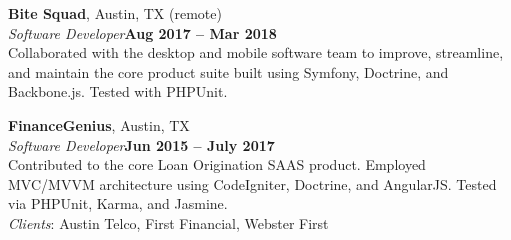 \documentclass[margin,line]{resume}
\begin{document}
\begin{resume}
\textbf{Bite Squad}, Austin, TX {\footnotesize (remote)}
\vspace{2mm}\\
\textsl{Software Developer}\hfill \textbf{Aug 2017 -- Mar 2018}\vspace{1mm}\\
Collaborated with the desktop and mobile software team to improve, streamline, and maintain the core product suite built using Symfony, Doctrine, and Backbone.js. Tested with PHPUnit.

\textbf{FinanceGenius}, Austin, TX
\vspace{2mm}\\
\textsl{Software Developer}\hfill \textbf{Jun 2015 -- July 2017}\vspace{1mm}\\
Contributed to the core Loan Origination SAAS product. Employed MVC/MVVM architecture using CodeIgniter, Doctrine, and AngularJS. Tested via PHPUnit, Karma, and Jasmine.\vspace{1mm}\\
\textsl{Clients}: {\small Austin Telco, First Financial, Webster First}


\end{resume}
\end{document}
